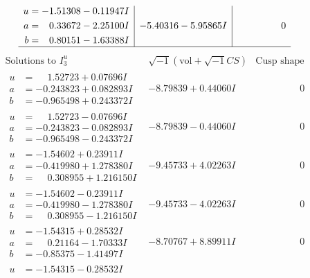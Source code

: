 \documentclass[1p]{elsarticle_modified}
\theoremstyle{definition}
\newcommand{\I}{\sqrt{-1}}
\begin{document}
$$\begin{array}{c|c|c}
\begin{aligned}
u &= -1.51308 - 0.11947 I \\
a &= \phantom{-}0.33672 - 2.25100 I \\
b &= \phantom{-}0.80151 - 1.63388 I\end{aligned}
 & -5.40316 - 5.95865 I & \phantom{-0.000000 } 0\\
 \hline 
 \end{array}$$\newpage$$\begin{array}{c|c|c}  
\text{Solutions to }I^u_{3}& \I (\text{vol} + \sqrt{-1}CS) & \text{Cusp shape}\\
 \hline 
\begin{aligned}
u &= \phantom{-}1.52723 + 0.07696 I \\
a &= -0.243823 + 0.082893 I \\
b &= -0.965498 + 0.243372 I\end{aligned}
 & -8.79839 + 0.44060 I & \phantom{-0.000000 } 0 \\ \hline\begin{aligned}
u &= \phantom{-}1.52723 - 0.07696 I \\
a &= -0.243823 - 0.082893 I \\
b &= -0.965498 - 0.243372 I\end{aligned}
 & -8.79839 - 0.44060 I & \phantom{-0.000000 } 0 \\ \hline\begin{aligned}
u &= -1.54602 + 0.23911 I \\
a &= -0.419980 + 1.278380 I \\
b &= \phantom{-}0.308955 + 1.216150 I\end{aligned}
 & -9.45733 + 4.02263 I & \phantom{-0.000000 } 0 \\ \hline\begin{aligned}
u &= -1.54602 - 0.23911 I \\
a &= -0.419980 - 1.278380 I \\
b &= \phantom{-}0.308955 - 1.216150 I\end{aligned}
 & -9.45733 - 4.02263 I & \phantom{-0.000000 } 0 \\ \hline\begin{aligned}
u &= -1.54315 + 0.28532 I \\
a &= \phantom{-}0.21164 - 1.70333 I \\
b &= -0.85375 - 1.41497 I\end{aligned}
 & -8.70767 + 8.89911 I & \phantom{-0.000000 } 0 \\ \hline\begin{aligned}
u &= -1.54315 - 0.28532 I \\

\end{aligned}
\end{array}$$
\end{document}
